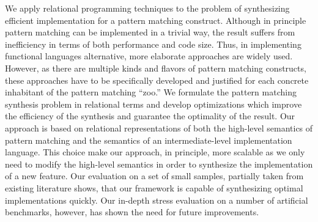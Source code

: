    We apply relational programming techniques to the problem of synthesizing efficient implementation for a pattern matching construct. Although in principle
   pattern matching can be implemented in a trivial way, the result suffers from inefficiency in terms of both performance and code size. Thus, in implementing functional languages alternative, more elaborate  approaches are widely used. However, as there are multiple kinds and flavors of pattern
   matching constructs, these approaches have to be specifically developed and justified for each concrete inhabitant of the pattern matching ``zoo.'' We formulate the
   pattern matching synthesis problem in relational terms and develop optimizations which improve the efficiency of the synthesis and guarantee the
   optimality of the result. Our approach is based on relational representations of both the high-level semantics of pattern matching and the semantics of
   an intermediate-level implementation language. This choice make our approach, in principle, more scalable as we only need to modify the high-level semantics in order
   to synthesize the implementation of a new feature. Our evaluation on a set of small samples, partially taken from existing literature shows, that our framework is
   capable of synthesizing optimal implementations quickly. Our in-depth stress evaluation on a number of artificial benchmarks, however,
   has shown the need for future improvements.
